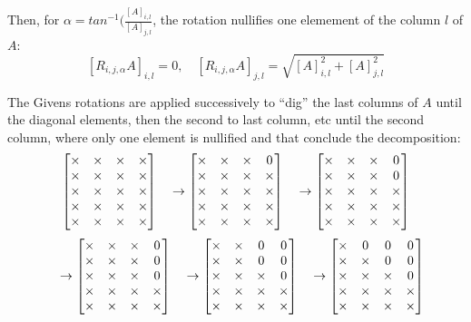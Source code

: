 \documentclass{book}
\begin{document}
Then, for $\alpha = tan^{-1}( \frac{[A]_{i,l}}{[A]_{j,l}}$, the rotation nullifies one elemement of the column $l$ of $A$:
$$ [R_{i,j,\alpha} A]_{i,l} = 0, \quad  [R_{i,j,\alpha} A]_{j,l} = \sqrt{[A]_{i,l}^2 + [A]_{j,l}^2}$$

The Givens rotations are applied successively to ``dig'' the last columns of $A$ until the diagonal elements, then the second to last column, etc until the second column, where only one element is nullified and that conclude the decomposition:
$$ 
\begin{bmatrix} 
\times &\times &\times &\times  \\
\times &\times &\times &\times  \\
\times &\times &\times &\times  \\
\times &\times &\times &\times  \\
\times &\times &\times &\times  \end{bmatrix}
\quad \rightarrow
\begin{bmatrix} 
\times &\times &\times &0  \\
\times &\times &\times &\times  \\
\times &\times &\times &\times  \\
\times &\times &\times &\times  \\
\times &\times &\times &\times  \end{bmatrix}
\quad \rightarrow
\begin{bmatrix} 
\times &\times &\times &0  \\
\times &\times &\times &0  \\
\times &\times &\times &\times  \\
\times &\times &\times &\times  \\
\times &\times &\times &\times  \end{bmatrix}
$$
$$
\quad \rightarrow
\begin{bmatrix} 
\times &\times &\times &0  \\
\times &\times &\times &0  \\
\times &\times &\times &0  \\
\times &\times &\times &\times  \\
\times &\times &\times &\times  \end{bmatrix}
\quad \rightarrow
\begin{bmatrix} 
\times &\times &0 &0  \\
\times &\times &0  &0  \\
\times &\times &\times &0  \\
\times &\times &\times &\times  \\
\times &\times &\times &\times  \end{bmatrix}
\quad \rightarrow 
\begin{bmatrix} 
\times &0 &0 &0  \\
\times &\times &0 &0  \\
\times &\times &\times &0  \\
\times &\times &\times &\times  \\
\times &\times &\times &\times  \end{bmatrix}
$$
\end{document}
